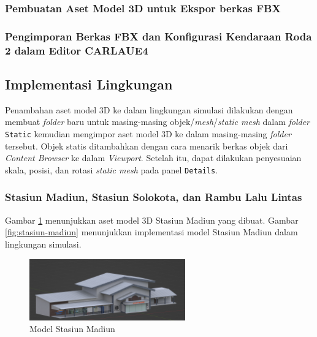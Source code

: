 \subsubsection{Pembuatan Aset Model 3D untuk Ekspor berkas FBX}


\subsubsection{Pengimporan Berkas FBX dan Konfigurasi Kendaraan Roda 2 dalam Editor CARLAUE4}


\subsection{Implementasi Lingkungan}

Penambahan aset model 3D ke dalam lingkungan simulasi dilakukan dengan membuat
\textit{folder} baru untuk masing-masing objek/\textit{mesh}/\textit{static
mesh} dalam \textit{folder} \verb|Static| kemudian mengimpor aset model 3D ke
dalam masing-masing \textit{folder} tersebut. Objek statis ditambahkan dengan
cara menarik berkas objek dari \textit{Content Browser} ke dalam
\textit{Viewport}. Setelah itu, dapat dilakukan penyesuaian skala, posisi, dan
rotasi \textit{static mesh} pada panel \verb|Details|.

\subsubsection{Stasiun Madiun, Stasiun Solokota, dan Rambu Lalu Lintas}

Gambar \ref{fig:stasiun-madiun-model} menunjukkan aset model 3D Stasiun Madiun
yang dibuat. Gambar \ref{fig:stasiun-madiun} menunjukkan implementasi model
Stasiun Madiun dalam lingkungan simulasi.

\begin{figure}[!h]
    \centering
    \includegraphics[width=0.6\textwidth]{resources/chapter-3-stasiun-madiun-model.png}
    \caption{Model Stasiun Madiun}
    \label{fig:stasiun-madiun-model}
\end{figure}


